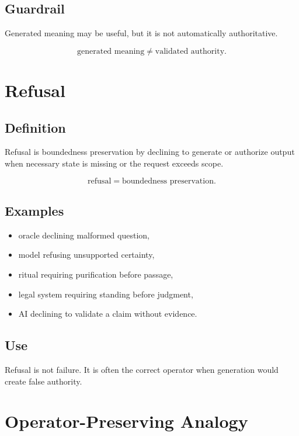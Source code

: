 \documentclass[11pt]{book}
\begin{document}
\subsection*{Guardrail}

Generated meaning may be useful, but it is not automatically authoritative.

\[
\text{generated meaning} \neq \text{validated authority}.
\]

\section{Refusal}

\subsection*{Definition}

Refusal is boundedness preservation by declining to generate or authorize output when necessary state is missing or the request exceeds scope.

\[
\text{refusal} = \text{boundedness preservation}.
\]

\subsection*{Examples}

\begin{itemize}
    \item oracle declining malformed question,
    \item model refusing unsupported certainty,
    \item ritual requiring purification before passage,
    \item legal system requiring standing before judgment,
    \item AI declining to validate a claim without evidence.
\end{itemize}

\subsection*{Use}

Refusal is not failure. It is often the correct operator when generation would create false authority.

\section{Operator-Preserving Analogy}
\end{document}
